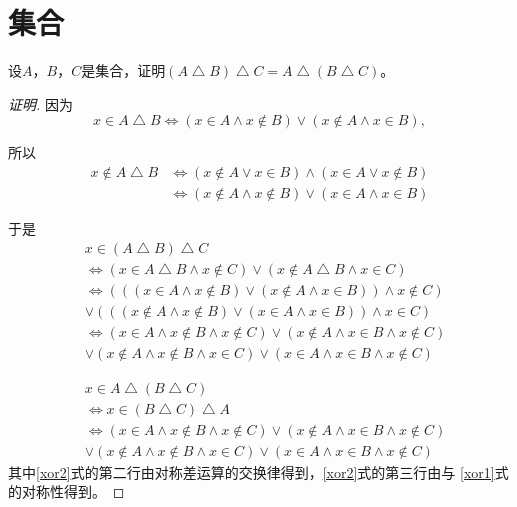 \chapter{集合}
\begin{Ex}
设$A$，$B$，$C$是集合，证明$(A\bigtriangleup B)\bigtriangleup C =
A\bigtriangleup (B\bigtriangleup C)$。
\end{Ex}
\begin{proof}[证明]
  
  因为
  \begin{equation}
  x \in A \bigtriangleup B \Leftrightarrow
  (x \in A \land x \notin B) \lor (x \notin A \land x
  \in B),    
  \end{equation}

  所以
  \begin{equation}
    \begin{split}
      x \notin A \bigtriangleup B &\Leftrightarrow
  (x \notin A \lor x \in B) \land (x \in A \lor x
  \notin B)\\
  &\Leftrightarrow (x \notin A \land x \notin B) \lor (x \in A \land x \in B )
    \end{split}
  \end{equation}

  于是
  \begin{equation}\label{xor1}
    \begin{split}
      &x \in (A \bigtriangleup B) \bigtriangleup C\\
      &\Leftrightarrow (x \in A \bigtriangleup B \land x \notin C) \lor (x \notin A \bigtriangleup B \land x \in C)\\
      &\Leftrightarrow (((x \in A \land x \notin B) \lor (x \notin A \land x \in B)) \land x \notin C)\\
      &\lor (((x \notin A \land x \notin B) \lor (x \in A \land x \in B )) \land x \in C)\\
      &\Leftrightarrow (x \in A \land x \notin B \land x \notin C) \lor (x \notin A \land x \in B \land x \notin C)\\
      &\lor (x \notin A \land x \notin B \land x \in C) \lor (x \in A \land x \in B \land x \notin C)
    \end{split}
  \end{equation}

  \begin{equation}\label{xor2}
    \begin{split}
      &x \in A \bigtriangleup (B \bigtriangleup C)\\
      &\Leftrightarrow x \in (B \bigtriangleup C) \bigtriangleup A\\
      &\Leftrightarrow (x \in A \land x \notin B \land x \notin C) \lor (x \notin A \land x \in B \land x \notin C)\\
      &\lor (x \notin A \land x \notin B \land x \in C) \lor (x \in A \land x \in B \land x \notin C)
    \end{split}
  \end{equation}
  其中\eqref{xor2}式的第二行由对称差运算的交换律得到，\eqref{xor2}式的第三行由与
   \eqref{xor1}式的对称性得到。


\end{proof}
